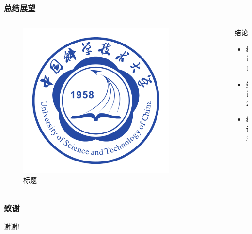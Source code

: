 \documentclass{ctexbeamer}
\begin{document}
\begin{frame}
  \frametitle{总结展望}
  \begin{columns}
    \begin{column}{0.50\textwidth}
      \begin{figure}
        \includegraphics[width=0.8\textwidth]{figures/ustc_logo.pdf}
        \caption{标题}
      \end{figure}
    \end{column}
    \begin{column}{0.50\textwidth}
      \begin{block}{结论}
        \begin{itemize}
          \item 结论 1
          \item 结论 2
          \item 结论 3
        \end{itemize}
      \end{block}
    \end{column}
  \end{columns}
\end{frame}

\begin{frame}
  \frametitle{致谢}
  \centerline{\Large 谢谢!}
\end{frame}
\end{document}
